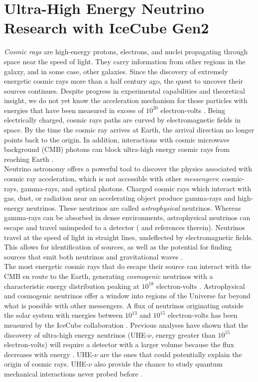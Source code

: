\documentclass[../../../main.tex]{subfiles}
\begin{document}
\section{Ultra-High Energy Neutrino Research with IceCube Gen2}
\label{sec:neutrino}

\textit{Cosmic rays} are high-energy protons, electrons, and nuclei propagating through space near the speed of light.  They carry information from other regions in the galaxy, and in some case, other galaxies.  Since the discovery of extremely energetic cosmic rays more than a half century ago, the quest to uncover their sources continues.  Despite progress in experimental capabilities and theoretical insight, we do not yet know the acceleration mechanism for those particles with energies that have been measured in excess of $10^{20}$ electron-volts \cite{10.1088/1742-6596/1766/1/012002}.  Being electrically charged, cosmic rays paths are curved by electromagnetic fields in space.  By the time the cosmic ray arrives at Earth, the arrival direction no longer points back to the origin.  In addition, interactions with cosmic microwave background (CMB) photons can block ultra-high energy cosmic rays from reaching Earth \cite{PhysRevLett.16.748} \cite{1966JETPL...4...78Z}.
\\
\vspace{0.15cm}
Neutrino astronomy offers a powerful tool to discover the physics associated with cosmic ray acceleration, which is not accessible with other \textit{messengers}: cosmic-rays, gamma-rays, and  optical photons. Charged cosmic rays which interact with gas, dust, or radiation near an accelerating object produce gamma-rays and high-energy neutrinos.  These neutrinos are called \textit{astrophysical} neutrinos. Whereas gamma-rays can be absorbed in dense environments, astrophysical neutrinos can escape and travel unimpeded to a detector (\cite{Astro2020_1} and references therein). Neutrinos travel at the speed of light in straight lines, undeflected by electromagnetic fields.  This allows for identification of sources, as well as the potential for finding sources that emit both neutrinos and gravitational waves \cite{10.3847/2041-8213/ab9d24}.
\\
\vspace{0.15cm}
The most energetic cosmic rays that do escape their source can interact with the CMB en route to the Earth, generating \textit{cosmogenic} neutrinos with a characteristic energy distribution peaking at $10^{18}$ electron-volts \cite{10.1007/bf00645585} \cite{BERESINSKY1969423}.  Astrophysical and cosmogenic neutrinos offer a window into regions of the Universe far beyond what is possible with other messengers.  A flux of neutrinos originating outside the solar system with energies between $10^{13}$ and $10^{15}$ electron-volts has been measured by the IceCube collaboration \cite{PhysRevLett.111.021103}. Previous analyses have shown that the discovery of ultra-high energy neutrinos (UHE-$\nu$, energy greater than $10^{15}$ electron-volts) will require a detector with a larger volume because the flux decreases with energy \cite{PhysRevD.98.062003}. UHE-$\nu$ are the ones that could potentially explain the origin of cosmic rays.  UHE-$\nu$ also provide the chance to study quantum mechanical interactions never probed before \cite{Astro2020_1} \cite{Astro2020_2}.
\end{document}
